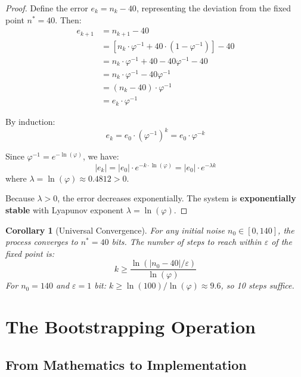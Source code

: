 \documentclass[11pt,a4paper]{article}
\newtheorem{corollary}{Corollary}[theorem]
\begin{document}
\begin{proof}
Define the error $e_k = n_k - 40$, representing the deviation from the fixed point $n^* = 40$. Then:
\begin{align}
    e_{k+1} &= n_{k+1} - 40 \\
    &= [n_k \cdot \varphi^{-1} + 40 \cdot (1 - \varphi^{-1})] - 40 \\
    &= n_k \cdot \varphi^{-1} + 40 - 40\varphi^{-1} - 40 \\
    &= n_k \cdot \varphi^{-1} - 40\varphi^{-1} \\
    &= (n_k - 40) \cdot \varphi^{-1} \\
    &= e_k \cdot \varphi^{-1}
\end{align}

By induction:
\begin{equation}
    e_k = e_0 \cdot (\varphi^{-1})^k = e_0 \cdot \varphi^{-k}
\end{equation}

Since $\varphi^{-1} = e^{-\ln(\varphi)}$, we have:
\begin{equation}
    |e_k| = |e_0| \cdot e^{-k \cdot \ln(\varphi)} = |e_0| \cdot e^{-\lambda k}
\end{equation}
where $\lambda = \ln(\varphi) \approx 0.4812 > 0$.

Because $\lambda > 0$, the error decreases exponentially. The system is \textbf{exponentially stable} with Lyapunov exponent $\lambda = \ln(\varphi)$.
\end{proof}

\begin{corollary}[Universal Convergence]
For any initial noise $n_0 \in [0, 140]$, the process converges to $n^* = 40$ bits. The number of steps to reach within $\varepsilon$ of the fixed point is:
\begin{equation}
    k \geq \frac{\ln(|n_0 - 40|/\varepsilon)}{\ln(\varphi)}
\end{equation}
For $n_0 = 140$ and $\varepsilon = 1$ bit: $k \geq \ln(100)/\ln(\varphi) \approx 9.6$, so 10 steps suffice.
\end{corollary}

\section{The Bootstrapping Operation}

\subsection{From Mathematics to Implementation}
\end{document}
